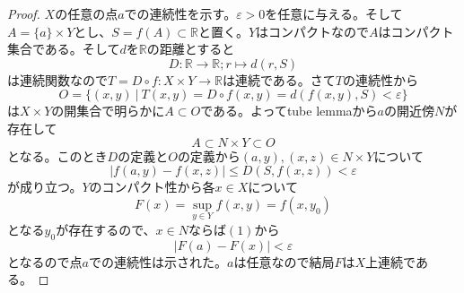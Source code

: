 \documentclass[leqno]{jsarticle}
\newcommand{\rr}{\mathbb{R}}
\newcommand{\ep}{\varepsilon}
\begin{document}
\begin{proof}
$X$の任意の点$a$での連続性を示す。$\ep>0$を任意に与える。そして$A=\{a\}\times Y$とし、$S=f(A)\subset \rr$と置く。$Y$はコンパクトなので$A$はコンパクト集合である。そして$d$を$\rr$の距離とすると
\[
D:\rr\to \rr ;r\mapsto d(r,S)
\]
は連続関数なので$T=D\circ f:X\times Y\to \rr$は連続である。さて$T$の連続性から
\[
O=\{(x,y)\ |\ T(x,y)=D\circ f(x,y)=d(f(x,y),S)<\ep\}
\]
は$X\times Y$の開集合で明らかに$A\subset O$である。よってtube lemmaから$a$の開近傍$N$が存在して
\[
A\subset N\times Y\subset O
\]
となる。このとき$D$の定義と$O$の定義から$(a,y),(x,z)\in N\times Y$について
\begin{equation}
|f(a,y)-f(x,z)|\le D(S,f(x,z))<\ep
\end{equation}
が成り立つ。$Y$のコンパクト性から各$x\in X$について
\[
F(x)=\sup_{y\in Y}f(x,y)=f(x,y_0)
\]
となる$y_0$が存在するので、$x\in N$ならば$(1)$から
\[
|F(a)-F(x)|<\ep
\]
となるので点$a$での連続性は示された。$a$は任意なので結局$F$は$X$上連続である。
\end{proof}
\end{document}

